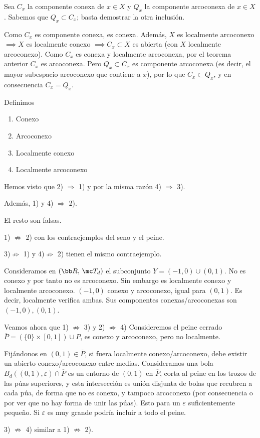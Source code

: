 \begin{dem}
Sea $C_x$ la componente conexa de $x \in X$ y $Q_x$ la componente arcoconexa de $x \in X$. Sabemos que $Q_x \subset C_x$; basta demostrar la otra inclusión.

Como $C_x$ es componente conexa, es conexa. Además, $X$ es localmente arcoconexo $\implies X$ es localmente conexo $\implies C_x \subset X$ es abierta (con $X$ localmente arcoconexo). Como $C_x$ es conexa y localmente arcoconexa, por el teorema anterior $C_x$ es arcoconexa. Pero $Q_x \subset C_x$ es componente arcoconexa (es decir, el mayor subespacio arcoconexo que contiene a $x$), por lo que $C_x \subset Q_x$, y en consecuencia $C_x = Q_x$.
\end{dem}
\begin{custom}
    [Contraejemplos] Definimos
    \begin{enumerate}[1)]
        \item Conexo
        \item Arcoconexo
        \item Localmente conexo
        \item Localmente arcoconexo
    \end{enumerate}
    Hemos visto que 2) $\Rightarrow$ 1) y por la misma raz\'on 4) $\Rightarrow$ 3). 

    Adem\'as, 1) y 4) $\Rightarrow$ 2). 

    El resto son falsas.
    
    1) $\not\Rightarrow$ 2) con los contraejemplos del seno y el peine.

    3)$\not\Rightarrow$ 1) y 4)$\not\Rightarrow$ 2) tienen el mismo contraejemplo. 
    
    Consideramos en $(\bb R, \, \mc T_d)$ el subconjunto $Y = (-1,0) \cup (0,1)$. No es conexo y por tanto no es arcoconexo. Sin embargo es localmente conexo y localmente arcoconexo. $(-1,0)$ conexo y arcoconexo, igual para $(0,1)$. Es decir, localmente verifica ambas. Sus componentes conexas/arcoconexas son $(-1,0), (0,1)$. 

    Veamos ahora que 1) $\not\Rightarrow$ 3) y 2) $\not\Rightarrow$ 4) Consideremos el peine cerrado $\overline{P} = (\{0\}\times [0,1]) \cup P$, es conexo y arcoconexo, pero no localmente. 
    
    Fij\'andonos en $(0,1) \in \overline{P}$, si fuera localmente conexo/arcoconexo, debe existir un abierto conexo/arcoconexo entre medias. Consideramos una bola $B_d((0,1),\varepsilon) \cap \overline{P}$ es un entorno de $(0,1)$ en $\overline{P}$, corta al peine en los trozos de las p\'uas superiores, y esta intersecci\'on es uni\'on disjunta de bolas que recubren a cada p\'ua, de forma que no es conexo, y tampoco arcoconexo (por consecuencia o por ver que no hay forma de unir las p\'uas). Esto para un $\varepsilon$ suficientemente peque\~no. Si $\varepsilon$ es muy grande podr\'ia incluir a todo el peine.  

    3) $\not\Rightarrow$ 4) similar a 1) $\not\Rightarrow$ 2).
\end{custom}

